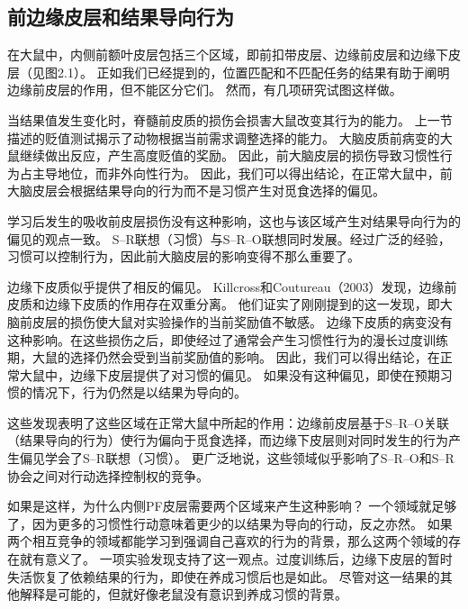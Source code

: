 \subsection{前边缘皮层和结果导向行为}

在大鼠中，内侧前额叶皮层包括三个区域，即前扣带皮层、边缘前皮层和边缘下皮层（见图2.1）。
正如我们已经提到的，位置匹配和不匹配任务的结果有助于阐明边缘前皮层的作用，但不能区分它们。
然而，有几项研究试图这样做。\par


当结果值发生变化时，脊髓前皮质的损伤会损害大鼠改变其行为的能力。
上一节描述的贬值测试揭示了动物根据当前需求调整选择的能力。
大脑皮质前病变的大鼠继续做出反应，产生高度贬值的奖励。
因此，前大脑皮层的损伤导致习惯性行为占主导地位，而非外向性行为\cite{Balleine&Dickinson 1998;Corbit&Balleine 2003}。
因此，我们可以得出结论，在正常大鼠中，前大脑皮层会根据结果导向的行为而不是习惯产生对觅食选择的偏见。\par


学习后发生的吸收前皮层损伤没有这种影响\cite{Ostlund&Balleine 2005}，这也与该区域产生对结果导向行为的偏见的观点一致。
S–R联想（习惯）与S–R–O联想同时发展。经过广泛的经验，习惯可以控制行为，因此前大脑皮层的影响变得不那么重要了。\par


边缘下皮质似乎提供了相反的偏见。
Killcross和Coutureau（2003）发现，边缘前皮质和边缘下皮质的作用存在双重分离。
他们证实了刚刚提到的这一发现，即大脑前皮层的损伤使大鼠对实验操作的当前奖励值不敏感。
边缘下皮质的病变没有这种影响。在这些损伤之后，即使经过了通常会产生习惯性行为的漫长过度训练期，大鼠的选择仍然会受到当前奖励值的影响。
因此，我们可以得出结论，在正常大鼠中，边缘下皮层提供了对习惯的偏见。
如果没有这种偏见，即使在预期习惯的情况下，行为仍然是以结果为导向的。\par


这些发现表明了这些区域在正常大鼠中所起的作用：边缘前皮层基于S–R–O关联（结果导向的行为）使行为偏向于觅食选择，而边缘下皮层则对同时发生的行为产生偏见学会了S–R联想（习惯）。
更广泛地说，这些领域似乎影响了S–R–O和S–R协会之间对行动选择控制权的竞争。\par


如果是这样，为什么内侧PF皮层需要两个区域来产生这种影响？
一个领域就足够了，因为更多的习惯性行动意味着更少的以结果为导向的行动，反之亦然。
如果两个相互竞争的领域都能学习到强调自己喜欢的行为的背景，那么这两个领域的存在就有意义了。
一项实验发现支持了这一观点。过度训练后，边缘下皮层的暂时失活恢复了依赖结果的行为，即使在养成习惯后也是如此\cite{Coutureau&Killcross,2003}。
尽管对这一结果的其他解释是可能的，但就好像老鼠没有意识到养成习惯的背景。\par



